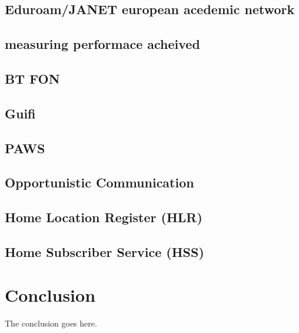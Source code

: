 \documentclass[journal]{IEEEtran}
\begin{document}
\subsection{ Eduroam/JANET european acedemic network }
\subsection{ measuring performace acheived }
\subsection{ BT FON }
\subsection{ Guifi }
\subsection{ PAWS }
\subsection{ Opportunistic Communication }
\subsection{ Home Location Register (HLR) }
\subsection{ Home Subscriber Service (HSS) }

\section{Conclusion}
The conclusion goes here.



%
%
%
\end{document}
